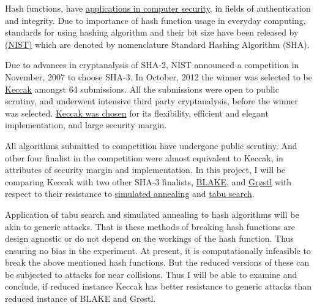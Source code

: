 \begin{abstractpage}

  Hash functions, have \href{"http://en.wikipedia.org/wiki/Cryptographic\_hash\_function\#Applications"}
  {applications in computer security}, in fields of authentication and integrity.
  Due to importance of hash function usage in everyday computing, standards for using hashing 
  algorithm and their bit size have been released by \href{"http://www.nist.gov/index.html"}
  {(NIST)} which are denoted by nomenclature Standard Hashing Algorithm (SHA).

  Due to advances in cryptanalysis of SHA-2, NIST announced a competition in November, 2007 
  to choose SHA-3. In October, 2012 the winner was selected to be \href{"http://keccak.noekeon.org/"}
  {Keccak} amongst 64 submissions. All the submissions were open to public scrutiny, and underwent
  intensive third party cryptanalysis, before the winner was selected. 
  \href{"http://csrc.nist.gov/groups/ST/hash/sha-3/sha-3\_selection\_announcement.pdf"}{Keccak was chosen}
   for its flexibility, efficient and elegant implementation, and large security margin.

  All algorithms submitted to competition have undergone public scrutiny. And other four finalist in 
  the competition were almost equivalent to Keccak, in attributes of security margin and implementation.
  In this project, I will be comparing Keccak with two other SHA-3 finalists, \href{"https://131002.net/blake/"}
  {BLAKE}, and \href{"http://www.groestl.info/"}{Gr{\o}stl} with respect to their resistance to 
  \href{"http://en.wikipedia.org/wiki/Simulated\_annealing"}{simulated annealing} and 
  \href{"http://en.wikipedia.org/wiki/Tabu\_search"}{tabu search}.
  
  Application of tabu search and simulated annealing to hash algorithms will be akin to generic attacks.
  That is these methods of breaking hash functions are design agnostic or do not depend on the workings
  of the hash function. Thus ensuring no bias in the experiment. At present, it is computationally infeasible
  to break the above mentioned hash functions. But the reduced versions of these can be subjected to attacks
  for near collisions. Thus I will be able to examine and conclude, if reduced instance Keccak has better 
  resistance to generic attacks than reduced instance of BLAKE and Gr{\o}stl.
  
\end{abstractpage}
